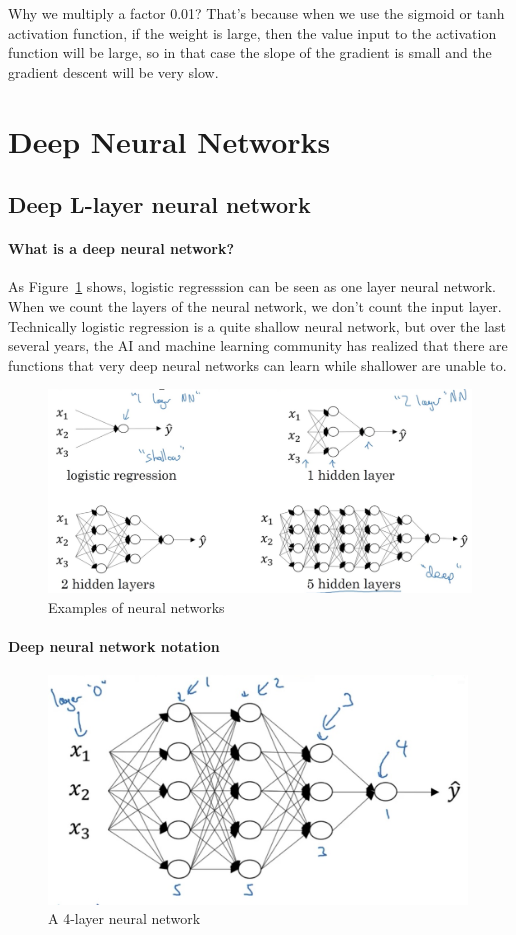 \documentclass[UTF8]{article}
\begin{document}
Why we multiply a factor 0.01? That's because when we use the sigmoid or tanh activation function,
if the weight is large, then the value input to the activation function will be large, so in that
case the slope of the gradient is small and the gradient descent will be very slow.

\section{Deep Neural Networks}
\subsection{Deep L-layer neural network}
\paragraph{What is a deep neural network?}
As Figure~\ref{fig:nn-examples} shows, logistic regresssion can be
seen as one layer neural network. When we count the layers of the neural network, we don't count
the input layer. Technically logistic regression is a quite shallow neural network, but over the
last several years, the AI and machine learning community has realized that there are functions
that very deep neural networks can learn while shallower are unable to.
\begin{figure}[htb]
    \centering
    \includegraphics[width=45em]{figures/nn-examples}
    \caption{Examples of neural networks}
    \label{fig:nn-examples}
\end{figure}

\paragraph{Deep neural network notation}
\begin{figure}[htb]
    \centering
    \includegraphics[width=30em]{figures/four-layer-nn}
    \caption{A 4-layer neural network}
    \label{fig:four-layer-nn}
\end{figure}
\end{document}
